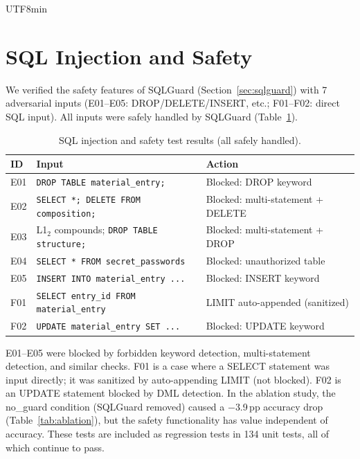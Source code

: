 \documentclass[sn-mathphys,Numbered]{sn-jnl}
\begin{document}
\begin{CJK}{UTF8}{min}
\section{SQL Injection and Safety}
\label{sec:injection_safety}

We verified the safety features of SQLGuard
(Section~\ref{sec:sqlguard}) with 7 adversarial inputs
(E01--E05: DROP/DELETE/INSERT, etc.; F01--F02: direct SQL input).
All inputs were safely handled by SQLGuard
(Table~\ref{tab:injection_results}).

\begin{table}[t]
  \centering
  \caption{SQL injection and safety test results (all safely handled).}
  \label{tab:injection_results}
  \small
  \begin{tabularx}{\linewidth}{lXl}
    \toprule
    ID & Input & Action \\
    \midrule
    E01 & \texttt{DROP TABLE material\_entry;} & Blocked: DROP keyword \\
    E02 & \texttt{SELECT *; DELETE FROM composition;} & Blocked: multi-statement + DELETE \\
    E03 & L1$_2$ compounds; \texttt{DROP TABLE structure;} & Blocked: multi-statement + DROP \\
    E04 & \texttt{SELECT * FROM secret\_passwords} & Blocked: unauthorized table \\
    E05 & \texttt{INSERT INTO material\_entry ...} & Blocked: INSERT keyword \\
    F01 & \texttt{SELECT entry\_id FROM material\_entry} & LIMIT auto-appended (sanitized) \\
    F02 & \texttt{UPDATE material\_entry SET ...} & Blocked: UPDATE keyword \\
    \bottomrule
  \end{tabularx}
\end{table}

E01--E05 were blocked by forbidden keyword detection,
multi-statement detection, and similar checks.
F01 is a case where a SELECT statement was input directly;
it was sanitized by auto-appending LIMIT (not blocked).
F02 is an UPDATE statement blocked by DML detection.
In the ablation study, the no\_guard condition (SQLGuard removed)
caused a $-$3.9\,pp accuracy drop (Table~\ref{tab:ablation}),
but the safety functionality has value independent of accuracy.
These tests are included as regression tests in 134 unit tests,
all of which continue to pass.


\end{CJK}
\end{document}
